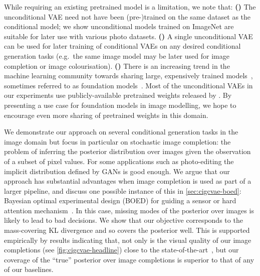 While requiring an existing pretrained model is a limitation, we note that:
\textbf{()} The unconditional VAE need not have been (pre-)trained on the same
dataset as the conditional model; we show unconditional models trained on
ImageNet are suitable for later use with various photo datasets.
\textbf{()} A single unconditional VAE can be used for later training of
conditional VAEs on any desired conditional generation tasks (e.g.~the same
image model may be later used for image completion or image colourisation).
\textbf{()} There is an increasing trend in the machine learning community towards
sharing large, expensively trained models~\citep{wolf2020transformers},
sometimes referred to as foundation models~\citep{bommasani2021opportunities}.
Most of the unconditional VAEs in our experiments use publicly-available
pretrained weights released by \citet{child2020very}. By presenting a use case
for foundation models in image modelling, we hope to encourage even more sharing
of pretrained weights in this domain.

We demonstrate our approach on several conditional generation tasks in the image
domain but focus in particular on stochastic image completion: the problem of
inferring the posterior distribution over images given the observation of a
subset of pixel values.
%
For some applications such as photo-editing the implicit distribution defined by
GANs is good enough. We argue that our approach has substantial advantages when
image completion is used as part of a larger pipeline, and discuss one possible
instance of this in \cref{sec:cigcvae-boed}: Bayesian optimal experimental design (BOED)
for guiding a sensor or hard attention
mechanism~\citep{ma2018eddi,harvey2019near,rangrej2021achieving}. In this case,
missing modes of the posterior over images is likely to lead to bad decisions.
We show that our objective corresponds to the mass-covering KL divergence and so
covers the posterior well.
%
This is supported empirically by results indicating that, not only is the visual
quality of our image completions (see \cref{fig:cigcvae-headline}) close to the
state-of-the-art~\citep{zhao2021large}, but our coverage of the ``true''
posterior over image completions is superior to that of any of our baselines.



